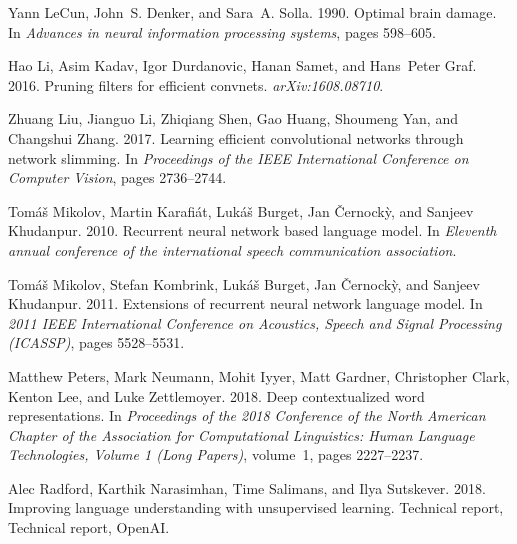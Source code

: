 \documentclass[11pt,a4paper]{article}
\begin{document}
\begin{thebibliography}{40}
Yann LeCun, John~S. Denker, and Sara~A. Solla. 1990.
\newblock Optimal brain damage.
\newblock In \emph{Advances in neural information processing systems}, pages
  598--605.

Hao Li, Asim Kadav, Igor Durdanovic, Hanan Samet, and Hans~Peter Graf. 2016.
\newblock Pruning filters for efficient convnets.
\newblock \emph{arXiv:1608.08710}.

Zhuang Liu, Jianguo Li, Zhiqiang Shen, Gao Huang, Shoumeng Yan, and Changshui
  Zhang. 2017.
\newblock Learning efficient convolutional networks through network slimming.
\newblock In \emph{Proceedings of the IEEE International Conference on Computer
  Vision}, pages 2736--2744.

Tom{\'a}{\v{s}} Mikolov, Martin Karafi{\'a}t, Luk{\'a}{\v{s}} Burget, Jan
  {\v{C}}ernock{\`y}, and Sanjeev Khudanpur. 2010.
\newblock Recurrent neural network based language model.
\newblock In \emph{Eleventh annual conference of the international speech
  communication association}.

Tom{\'a}{\v{s}} Mikolov, Stefan Kombrink, Luk{\'a}{\v{s}} Burget, Jan
  {\v{C}}ernock{\`y}, and Sanjeev Khudanpur. 2011.
\newblock Extensions of recurrent neural network language model.
\newblock In \emph{2011 IEEE International Conference on Acoustics, Speech and
  Signal Processing (ICASSP)}, pages 5528--5531.

Matthew Peters, Mark Neumann, Mohit Iyyer, Matt Gardner, Christopher Clark,
  Kenton Lee, and Luke Zettlemoyer. 2018.
\newblock Deep contextualized word representations.
\newblock In \emph{Proceedings of the 2018 Conference of the North American
  Chapter of the Association for Computational Linguistics: Human Language
  Technologies, Volume 1 (Long Papers)}, volume~1, pages 2227--2237.

Alec Radford, Karthik Narasimhan, Time Salimans, and Ilya Sutskever. 2018.
\newblock Improving language understanding with unsupervised learning.
\newblock Technical report, Technical report, OpenAI.


\end{thebibliography}
\end{document}
